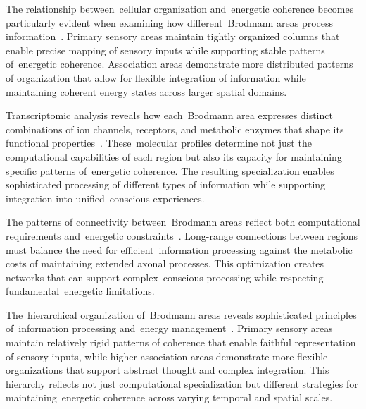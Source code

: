 The relationship between~cellular organization and~energetic coherence becomes particularly evident when examining how different~Brodmann areas process information~\cite{Passingham2002, bullmore2012economy}. Primary sensory areas maintain tightly organized columns that enable precise mapping of sensory inputs while supporting stable patterns of~energetic coherence. Association areas demonstrate more distributed patterns of organization that allow for flexible integration of information while maintaining coherent energy states across larger spatial domains.

Transcriptomic analysis reveals how each~Brodmann area expresses distinct combinations of ion channels, receptors, and metabolic enzymes that shape its functional properties~\cite{Lake2018, Bakken2021}. These~molecular profiles determine not just the computational capabilities of each region but also its capacity for maintaining specific patterns of~energetic coherence. The resulting specialization enables sophisticated processing of different types of information while supporting integration into unified~conscious experiences.

The patterns of connectivity between~Brodmann areas reflect both computational requirements and~energetic constraints~\cite{VanEssen2012, bullmore2012economy}. Long-range connections between regions must balance the need for efficient~information processing against the metabolic costs of maintaining extended axonal processes. This optimization creates networks that can support complex~conscious processing while respecting fundamental~energetic limitations.

The~hierarchical organization of~Brodmann areas reveals sophisticated principles of~information processing and~energy management~\cite{Amunts2015, breakspear2005dynamics}. Primary sensory areas maintain relatively rigid patterns of coherence that enable faithful representation of sensory inputs, while higher association areas demonstrate more flexible organizations that support abstract thought and complex integration. This hierarchy reflects not just computational specialization but different strategies for maintaining~energetic coherence across varying temporal and spatial scales.

